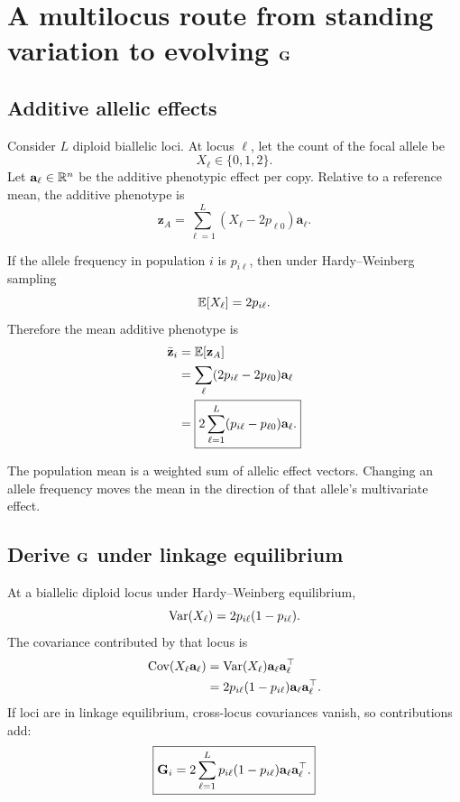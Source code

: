 \chapter{A multilocus route from standing variation to evolving \(\mathbf{G}\)}

\section{Additive allelic effects}

Consider \(L\) diploid biallelic loci. At locus \(\ell\), let the count of the focal allele be
\begin{equation}
X_\ell\in\{0,1,2\}.
\end{equation}
Let \(\mathbf a_\ell\in\mathbb R^n\) be the additive phenotypic effect per copy. Relative to a reference mean, the additive phenotype is
\begin{equation}
\mathbf z_A=\sum_{\ell=1}^L(X_\ell-2p_{\ell0})\mathbf a_\ell.
\label{eq:additiveGenotypeModel}
\end{equation}

If the allele frequency in population \(i\) is \(p_{i\ell}\), then under Hardy--Weinberg sampling
\begin{equation}
\mathbb E[X_\ell]=2p_{i\ell}.
\end{equation}
Therefore the mean additive phenotype is
\begin{align}
\bar{\mathbf z}_i
&=\mathbb E[\mathbf z_A]\\
&=\sum_\ell(2p_{i\ell}-2p_{\ell0})\mathbf a_\ell\\
&=\boxed{2\sum_{\ell=1}^L(p_{i\ell}-p_{\ell0})\mathbf a_\ell.}
\label{eq:meanFromAlleleFrequencies}
\end{align}

\inwords The population mean is a weighted sum of allelic effect vectors. Changing an allele frequency moves the mean in the direction of that allele's multivariate effect.

\section{Derive \(\mathbf{G}\) under linkage equilibrium}

At a biallelic diploid locus under Hardy--Weinberg equilibrium,
\begin{equation}
\operatorname{Var}(X_\ell)=2p_{i\ell}(1-p_{i\ell}).
\end{equation}
The covariance contributed by that locus is
\begin{align}
\operatorname{Cov}(X_\ell\mathbf a_\ell)
&=\operatorname{Var}(X_\ell)\mathbf a_\ell\mathbf a_\ell^\top\\
&=2p_{i\ell}(1-p_{i\ell})\mathbf a_\ell\mathbf a_\ell^\top.
\end{align}
If loci are in linkage equilibrium, cross-locus covariances vanish, so contributions add:
\begin{equation}
\boxed{
\mathbf{G}_i=2\sum_{\ell=1}^Lp_{i\ell}(1-p_{i\ell})
\mathbf a_\ell\mathbf a_\ell^\top.}
\label{eq:GfromAlleleFrequencies}
\end{equation}

